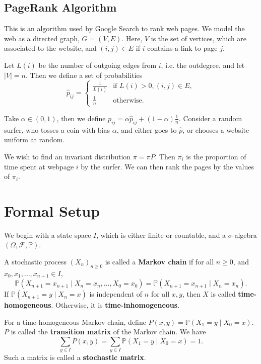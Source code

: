 \documentclass[12pt]{article}
\begin{document}
\subsection{PageRank Algorithm}%
\label{sub:pagerank_algorithm}

This is an algorithm used by Google Search to rank web pages. We model the web as a directed graph, $G = (V, E)$. Here, $V$ is the set of vertices, which are associated to the website, and $(i, j) \in E$ if $i$ contains a link to page $j$.

Let $L(i)$ be the number of outgoing edges from $i$, i.e. the outdegree, and let $|V| = n$. Then we define a set of probabilities
\[
	\hat{p}_{ij} =
\begin{cases}
	\frac{1}{L(i)} & \text{if } L(i) > 0, (i, j) \in E, \\
	\frac{1}{n} & \text{otherwise}.
\end{cases}
\]

Take $\alpha \in (0,1)$, then we define $p_{ij} = \alpha \hat{p}_{ij} + (1 - \alpha) \frac{1}{n}$. Consider a random surfer, who tosses a coin with bias $\alpha$, and either goes to $\hat p$, or chooses a website uniform at random.

We wish to find an invariant distribution $\pi = \pi P$. Then $\pi_{i}$ is the proportion of time spent at webpage $i$ by the surfer. We can then rank the pages by the values of $\pi_{i}$.

\newpage

\section{Formal Setup}%
\label{sec:formal_setup}

We begin with a state space $I$, which is either finite or countable, and a $\sigma$-algebra $(\Omega, \mathcal{F}, \mathbb{P})$.

\begin{definition}
	A stochastic process $(X_n)_{n \geq 0}$ is called a \textbf{Markov chain} if for all $n \geq 0$, and $x_{0}, x_{1} ,\ldots, x_{n+1} \in I$,
	\[
		\mathbb{P}(X_{n+1} = x_{n+1} \mid X_{n} = x_{n}, \ldots, X_{0} = x_{0}) = \mathbb{P}(X_{n+1} = x_{n+1} \mid X_{n} = x_{n})
	.\]
	If $\mathbb{P}(X_{n+1} = y \mid X_{n} = x)$ is independent of $n$ for all $x, y$, then $X$ is called \textbf{time-homogeneous}. Otherwise, it is \textbf{time-inhomogeneous}.

	For a time-homogeneous Markov chain, define $P(x, y) = \mathbb{P}(X_1 = y \mid X_0 = x)$. $P$ is called the \textbf{transition matrix} of the Markov chain. We have
	\[
		\sum_{y \in I} P(x, y) = \sum_{y \in I} \mathbb{P}(X_1 = y \mid X_0 = x) = 1
	.\]
	Such a matrix is called a \textbf{stochastic matrix}.
\end{definition}
\end{document}
